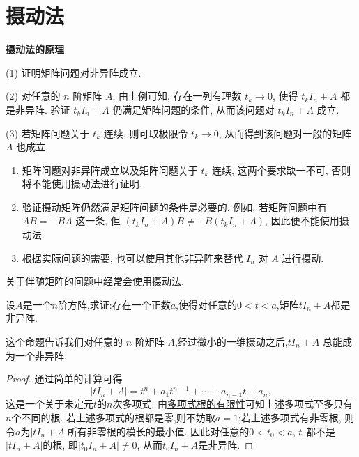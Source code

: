 \documentclass[../../main.tex]{subfiles}
\begin{document}
\section{摄动法}
\textbf{摄动法的原理}

(1) 证明矩阵问题对非异阵成立.

(2) 对任意的 \(n\) 阶矩阵 \(A\), 由上例可知, 存在一列有理数 \(t_k\rightarrow0\), 使得 \(t_kI_n + A\) 都是非异阵. 验证 \(t_kI_n + A\) 仍满足矩阵问题的条件, 从而该问题对 \(t_kI_n + A\) 成立.

(3) 若矩阵问题关于 \(t_k\) 连续, 则可取极限令 \(t_k\rightarrow0\), 从而得到该问题对一般的矩阵 \(A\) 也成立.

\begin{remark}
\begin{enumerate}
\item 矩阵问题对非异阵成立以及矩阵问题关于 \(t_k\) 连续, 这两个要求缺一不可, 否则将不能使用摄动法进行证明.
\item 验证摄动矩阵仍然满足矩阵问题的条件是必要的. 例如, 若矩阵问题中有 \(AB=-BA\) 这一条, 但 \((t_kI_n + A)B\neq -B(t_kI_n + A)\), 因此便不能使用摄动法.
\item 根据实际问题的需要, 也可以使用其他非异阵来替代 \(I_n\) 对 \(A\) 进行摄动.
\end{enumerate}
\end{remark}
\begin{note}
关于伴随矩阵的问题中经常会使用摄动法.
\end{note}


\begin{proposition}\label{proposition:摄动法基本命题}
设\(A\)是一个\(n\)阶方阵,求证:存在一个正数\(a\),使得对任意的\(0 < t < a\),矩阵\(tI_n+A\)都是非异阵. 
\end{proposition}
\begin{note}
这个命题告诉我们对任意的 \(n\) 阶矩阵 \(A\),经过微小的一维摄动之后,\(tI_n + A\) 总能成为一个非异阵.
\end{note}
\begin{proof}
通过简单的计算可得
\[
|tI_n + A| = t^n + a_1t^{n - 1}+\cdots+a_{n - 1}t + a_n,
\]
这是一个关于未定元\(t\)的\(n\)次多项式. 由\hyperref[proposition:多项式根的有限性]{多项式根的有限性}可知上述多项式至多只有\(n\)个不同的根. 若上述多项式的根都是零,则不妨取\(a = 1\);若上述多项式有非零根, 则令\(a\)为\(|tI_n + A|\)所有非零根的模长的最小值. 因此对任意的\(0 < t_0 < a\), \(t_0\)都不是\(|tI_n + A|\)的根, 即\(|t_0I_n + A|\neq0\), 从而\(t_0I_n + A\)是非异阵.

\end{proof}
\end{document}
